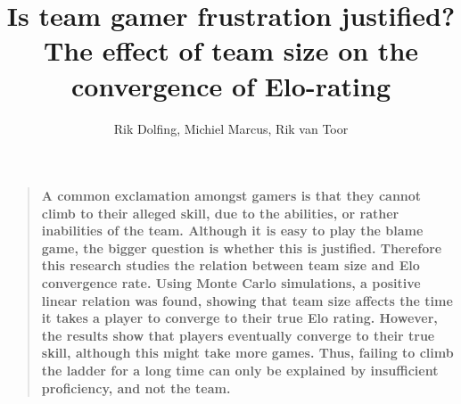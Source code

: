 \documentclass[12pt]{article}
\title{Is team gamer frustration justified? \\
	\large The effect of team size on the convergence of Elo-rating}
\author
{Rik Dolfing, Michiel Marcus, Rik van Toor}
\date{}
\newenvironment{sciabstract}{%
\begin{quote} \bf}
{\end{quote}}
\begin{document}
 


\baselineskip24pt


\maketitle 




\begin{sciabstract}
  A common exclamation amongst gamers is that they cannot climb to their alleged skill, due to the abilities, or rather inabilities of the team. Although it is easy to play the blame game, the bigger question is whether this is justified. Therefore this research studies the relation between team size and Elo convergence rate. Using Monte Carlo simulations, a positive linear relation was found, showing that team size affects the time it takes a player to converge to their true Elo rating. However, the results show that players eventually converge to their true skill, although this might take more games. Thus, failing to climb the ladder for a long time can only be explained by insufficient proficiency, and not the team.
\end{sciabstract}



\clearpage
\end{document}
